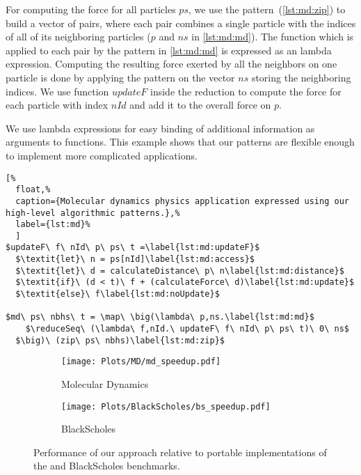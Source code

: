 For computing the force for all particles $ps$, we use the \zip pattern~(\autoref{lst:md:zip}) to build a vector of pairs, where each pair combines a single particle with the indices of all of its neighboring particles ($p$ and $ns$ in \autoref{lst:md:md}).
The function which is applied to each pair by the \map pattern in \autoref{lst:md:md} is expressed as an lambda expression.
Computing the resulting force exerted by all the neighbors on one particle is done by applying the \reduceSeq pattern on the vector $ns$ storing the neighboring indices.
We use function $updateF$ inside the reduction to compute the force for each particle with index $nId$ and add it to the overall force on $p$.

We use lambda expressions for easy binding of additional information as arguments to functions.
This example shows that our patterns are flexible enough to implement more complicated applications.


\begin{lstlisting}[%
  float,%
  caption={Molecular dynamics physics application expressed using our high-level algorithmic patterns.},%
  label={lst:md}%
  ]
$updateF\ f\ nId\ p\ ps\ t =\label{lst:md:updateF}$
  $\textit{let}\ n = ps[nId]\label{lst:md:access}$
  $\textit{let}\ d = calculateDistance\ p\ n\label{lst:md:distance}$
  $\textit{if}\ (d < t)\ f + (calculateForce\ d)\label{lst:md:update}$
  $\textit{else}\ f\label{lst:md:noUpdate}$

$md\ ps\ nbhs\ t = \map\ \big(\lambda\ p,ns.\label{lst:md:md}$
    $\reduceSeq\ (\lambda\ f,nId.\ updateF\ f\ nId\ p\ ps\ t)\ 0\ ns$
  $\big)\ (zip\ ps\ nbhs)\label{lst:md:zip}$
\end{lstlisting}

\begin{figure}[t]
  \centering
  \begin{subfigure}[b]{0.48\linewidth}
    \texttt{[image: Plots/MD/md\_speedup.pdf]}
    \caption{Molecular Dynamics}
    \label{fig:md:results}
  \end{subfigure}
  \hfill
  \begin{subfigure}[b]{0.48\linewidth}
    \texttt{[image: Plots/BlackScholes/bs\_speedup.pdf]}
    \caption{BlackScholes}
    \label{fig:blackScholes:results}
  \end{subfigure}
  \caption[Performance of our approach relative to native \OpenCL implementations of the \MD and BlackScholes benchmarks]%
          {Performance of our approach relative to portable \OpenCL implementations of the \MD and BlackScholes benchmarks.}
   \label{fig:bs:ms:results}
\end{figure}

